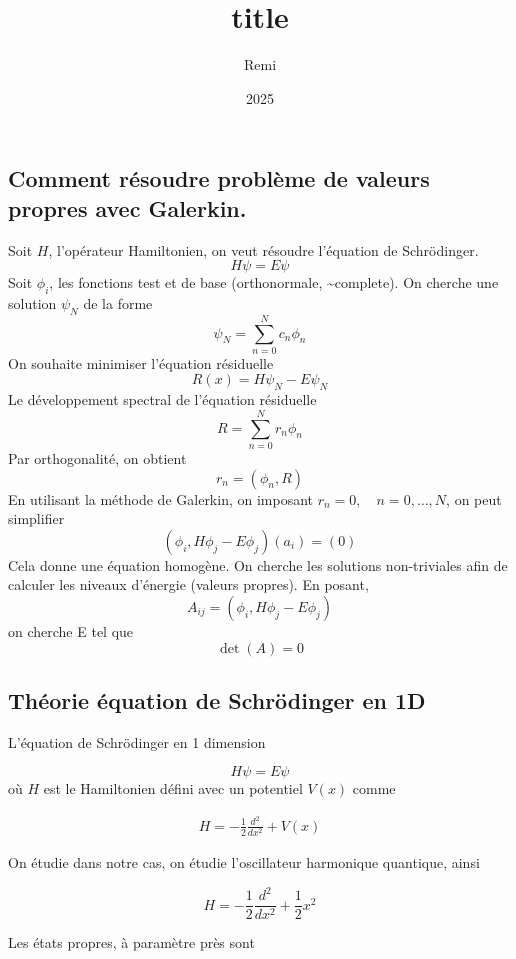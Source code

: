 \documentclass[11pt]{article}
\title{title}
\author{Remi}
\date{2025}
\begin{document}
\maketitle

\hypertarget{comment-ruxe9soudre-probluxe8me-de-valeurs-propres-avec-galerkin.}{%
\subsection{Comment résoudre problème de valeurs propres avec
Galerkin.}\label{comment-ruxe9soudre-probluxe8me-de-valeurs-propres-avec-galerkin.}}

Soit \(H\), l'opérateur Hamiltonien, on veut résoudre l'équation de
Schrödinger. \[
H\psi = E\psi
\] Soit \(\phi_{i}\), les fonctions test et de base (orthonormale,
\textasciitilde complete). On cherche une solution \(\psi _N\) de la
forme \[
\psi_{N} = \sum_{n=0}^{N}c_{n}\phi_{n}
\] On souhaite minimiser l'équation résiduelle \[
R(x) = H\psi_{N}-E\psi_{N}
\] Le développement spectral de l'équation résiduelle \[
R =\sum_{n=0}^{N}r_{n}\phi_{n}
\] Par orthogonalité, on obtient \[
r_{n} =(\phi_{n},R)
\] En utilisant la méthode de Galerkin, on imposant
\(r_{n}= 0, \quad n= 0,\dots,N\), on peut simplifier \[
(\phi_{i},H\phi_{j}-E\phi_{j})(a_{i}) = (0)
\] Cela donne une équation homogène. On cherche les solutions
non-triviales afin de calculer les niveaux d'énergie (valeurs propres).
En posant, \[
A_{ij} =(\phi_{i},H\phi_{j}-E\phi_{j}) 
\] on cherche E tel que \[
\det(A) = 0
\]

\hypertarget{thuxe9orie-uxe9quation-de-schruxf6dinger-en-1d}{%
\subsection{Théorie équation de Schrödinger en
1D}\label{thuxe9orie-uxe9quation-de-schruxf6dinger-en-1d}}

L'équation de Schrödinger en 1 dimension

\[
H\psi=E\psi
\] où \(H\) est le Hamiltonien défini avec un potentiel \(V(x)\) comme

\[
\begin{aligned}
H = -\frac{1}{2} \frac{d^{2}}{dx^{2}} +V(x)
\end{aligned}
\]

On étudie dans notre cas, on étudie l'oscillateur harmonique quantique,
ainsi

\[
H = -\frac{1}{2} \frac{d^{2}}{dx^{2}} + \frac{1}{2}x^{2}
\]

Les états propres, à paramètre près sont
\end{document}
